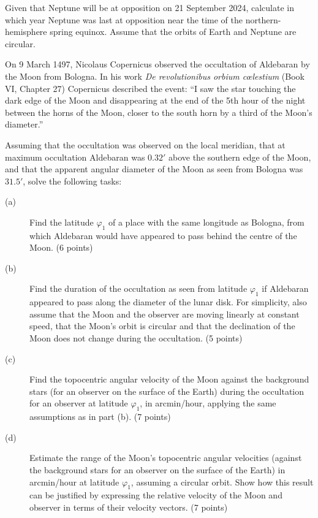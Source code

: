 Given that Neptune will be at opposition on 21 September 2024, calculate in
which year Neptune was last at opposition near the time of the
northern-hemisphere spring equinox. Assume that the orbits of Earth and Neptune
are circular.

On 9 March 1497, Nicolaus Copernicus observed the occultation of Aldebaran by
the Moon from Bologna. In his work \textit{De revolutionibus orbium
c\oe lestium} (Book VI, Chapter 27) Copernicus described the event: ``I saw the
star touching the dark edge of the Moon and disappearing at the end of the 5th
hour of the night between the horns of the Moon, closer to the south horn by a
third of the Moon's diameter.''

Assuming that the occultation was observed on the local meridian, that at
maximum occultation Aldebaran was $0.32'$ above the southern edge of the Moon,
and that the apparent angular diameter of the Moon as seen from Bologna was
$31.5'$, solve the following tasks:

\begin{description}
\item[(a)] Find the latitude $\varphi_1$ of a place with the same longitude as
  Bologna, from which Aldebaran would have appeared to pass behind the centre
  of the Moon. (6 points)
\item[(b)] Find the duration of the occultation as seen from latitude
  $\varphi_1$ if Aldebaran appeared to pass along the diameter of the lunar
  disk. For simplicity, also assume that the Moon and the observer are moving
  linearly at constant speed, that the Moon's orbit is circular and that the
  declination of the Moon does not change during the occultation. (5 points)
\item[(c)] Find the topocentric angular velocity of the Moon against the
  background stars (for an observer on the surface of the Earth) during the
  occultation for an observer at latitude $\varphi_1$, in arcmin/hour, applying
  the same assumptions as in part (b). (7 points)
\item[(d)] Estimate the range of the Moon's topocentric angular velocities
  (against the background stars for an observer on the surface of the Earth) in
  arcmin/hour at latitude $\varphi_1$, assuming a circular orbit. Show how this
  result can be justified by expressing the relative velocity of the Moon and
  observer in terms of their velocity vectors. (7 points)
\end{description}


